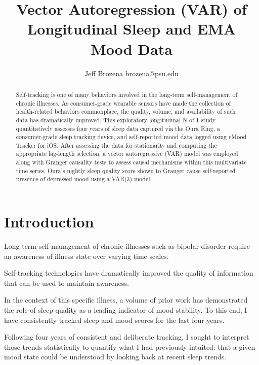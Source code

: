 \documentclass{article}
\begin{document}
\title{Vector Autoregression (VAR) of Longitudinal Sleep and EMA Mood Data}

\author{\name Jeff Brozena \email brozena@psu.edu}
\maketitle

\begin{abstract}%
  Self-tracking is one of many behaviors involved in the long-term
  self-management of chronic illnesses. As consumer-grade wearable
  sensors have made the collection of health-related behaviors commonplace,
  the quality, volume, and availability of such data has dramatically improved.
  This exploratory longitudinal N-of-1 study quantitatively assesses four years
  of sleep data captured via the Oura Ring, a consumer-grade sleep tracking
  device, and self-reported mood data logged using eMood Tracker for iOS. After
  assessing the data for stationarity and computing the appropriate lag-length
  selection, a vector autoregressive (VAR) model was employed along
  with Granger causality tests to assess causal mechanisms within this
  multivariate time series. Oura's nightly sleep quality score shown to Granger cause
  self-reported presence of depressed mood using a VAR(3) model.
\end{abstract}

\hypertarget{introduction}{%
\section{Introduction}\label{introduction}}

Long-term self-management of chronic illnesses such as bipolar disorder require
an awareness of illness state over varying time scales.

Self-tracking technologies have dramatically improved the quality of information that
can be used to maintain awareness.

In the context of this specific illness, a volume of prior work has demonstrated
the role of sleep quality as a leading indicator of mood stability. To this end,
I have consistently tracked sleep and mood scores for the last four years.

Following four years of consistent and deliberate tracking, I sought to
interpret those trends statistically to quantify what I had previously intuited:
that a given mood state could be understood by looking back at recent sleep
trends. 
\end{document}
